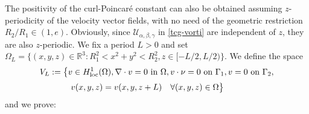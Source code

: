 \documentclass[a4paper,11pt]{amsart}
\numberwithin{equation}{section}
\numberwithin{figure}{section}
\def\U{{\mathcal U}}
\begin{document}
The positivity of the curl-Poincaré constant can also be obtained assuming $z$-periodicity of the velocity vector fields, with no need of the geometric restriction $R_2/R_1\in (1, e)$. Obviously, since $\U_{\alpha,\beta,\gamma}$ in \eqref{tcg-vorti} are independent of $z$, they are also $z$-periodic. We fix a period $L>0$ and set $\Omega_L=\{(x,y,z)\in \mathbb{R}^3:R_1^2<x^2+y^2<R_2^2, z\in [-L/2,L/2)\}$. We define the space
\begin{equation}\label{eq:V_L}\begin{aligned}
		V_L:= \big\{&v\in H^1_{\rm loc}(\Omega), \nabla\cdot v=0 \text{ in } \Omega, v\cdot \nu=0 \text{ on } \Gamma_1, v=0 \text{ on } \Gamma_2, \\[2pt]& \ v(x,y,z)=v(x,y,z+L) \quad  \forall (x,y,z)\in \Omega\big\}
	\end{aligned}
\end{equation}
and we prove:
\end{document}
